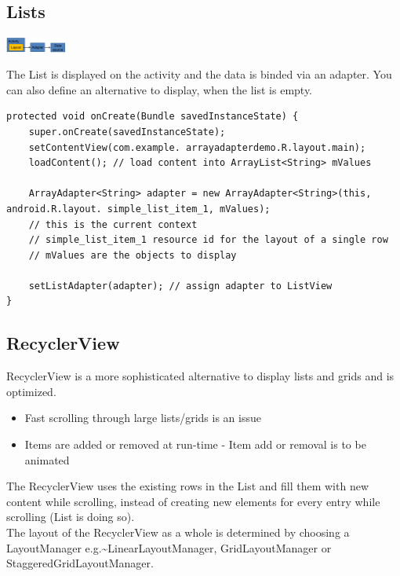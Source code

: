 \subsection{Lists}

\begin{breakbox}

\includegraphics[width=0.15\textwidth]{figures/listBinding.png}

The List is displayed on the activity and the data is binded via an adapter. You can
also define an alternative to display, when the list is empty.

\end{breakbox}

\begin{breakbox}

\begin{lstlisting}
protected void onCreate(Bundle savedInstanceState) {
    super.onCreate(savedInstanceState);
    setContentView(com.example. arrayadapterdemo.R.layout.main);
    loadContent(); // load content into ArrayList<String> mValues

    ArrayAdapter<String> adapter = new ArrayAdapter<String>(this, android.R.layout. simple_list_item_1, mValues);
    // this is the current context
    // simple_list_item_1 resource id for the layout of a single row
    // mValues are the objects to display

    setListAdapter(adapter); // assign adapter to ListView
}
\end{lstlisting}
\end{breakbox}


\subsection{RecyclerView}
\begin{breakbox}
RecyclerView is a more sophisticated alternative to display lists and
grids and is optimized. 
\begin{itemize}
    \item Fast scrolling through large lists/grids is an issue
    \item Items are added or removed at run-time - Item add or removal is to be animated
\end{itemize}

The RecyclerView uses the existing rows in the List and fill them with
new content while scrolling, instead of creating new elements for every
entry while scrolling (List is doing so). \\
The layout of the RecyclerView as a whole is determined by choosing a LayoutManager
e.g.\textasciitilde{}LinearLayoutManager, GridLayoutManager or
StaggeredGridLayoutManager.
\end{breakbox}

